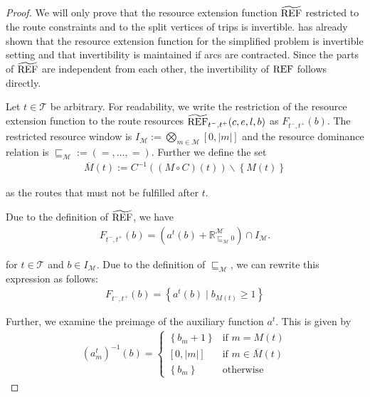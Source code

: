 \begin{proof}

We will only prove that the resource extension function $\widetilde{\operatorname{REF}}$ restricted to the route constraints and to the split vertices of trips is invertible. \cite{Kaiser} has already shown that the resource extension function for the simplified problem is invertible setting and that invertibility is maintained if arcs are contracted. Since the parts of $\widetilde{\operatorname{REF}}$ are independent from each other, the 	invertibility of $\operatorname{REF}$ follows directly.

Let ${t\in\mathcal{T}}$ be arbitrary. For readability, we write the restriction of the resource extension function to the route resources $\widetilde{\operatorname{REF}}_{t^-,t^+}(c,e,l,b)$ as $F_{t^-,t^+}(b)$. The restricted resource window is ${I_{\mathcal{M}}:=\bigotimes_{m\in\mathcal{M}}[0,\vert m\vert]}$ and the resource dominance relation is ${\sqsubseteq_{\mathcal{M}} := \left(=,\dots,=\right)}$. Further we define the set
\begin{align*}
	\overline{M}(t) := C^{-1}\left((M\circ C)(t)\right)\backslash\left\{M(t)\right\}
\end{align*}

as the routes that must not be fulfilled after $t$.

Due to the definition of $\widetilde{\operatorname{REF}}$, we have
\begin{align*}
	F_{t^-,t^+}\left(b\right) = \left(a^t(b) + \mathbb{R}^{\mathcal{M}}_{\sqsubseteq_{\mathcal{M}} 0}\right) \cap I_{\mathcal{M}}.
\end{align*}

for ${t\in\mathcal{T}}$ and ${b\in I_{\mathcal{M}}}$. Due to the definition of $\sqsubseteq_{\mathcal{M}}$, we can rewrite this expression as follows:
\begin{align*}
	F_{t^-,t^+}\left(b\right) = \left\{a^t(b)\mid b_{M(t)}\geq 1\right\}
\end{align*}

Further, we examine the preimage of the auxiliary function $a^t$. This is given by
\begin{align*}
	\left(a^t_m\right)^{-1}(b) = \begin{cases} \left\{b_m + 1\right\} & \text{if } m = M(t) \\ [0,\vert m\vert] & \text{if } m\in\overline{M}(t) \\ \left\{b_m\right\} & \text{otherwise} \end{cases}
\end{align*}


\end{proof}
